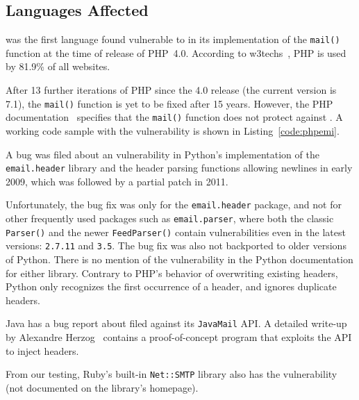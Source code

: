 \subsection{Languages Affected}

\label{languages}
 was the first language found vulnerable to \ehi in its implementation of the \texttt{mail()} function at the time of release of PHP~4.0. According to w3techs~\cite{W3techs}, PHP is used by 81.9\% of all websites.

After 13 further iterations of PHP since the 4.0 release (the current
version is 7.1), the \texttt{mail()} function is yet to be fixed after
15 years. However, the PHP documentation~\cite{PHPDocs} specifies that the \texttt{mail()} function does not protect against \ehi.
A working code sample with the vulnerability is shown in  Listing~\ref{code:phpemi}.

\begin{sloppypar}
A bug was filed about an \ehi vulnerability in Python's implementation of the \texttt{email.header} library and the header parsing functions allowing newlines in early 2009, which was followed by a partial patch in 2011.
\end{sloppypar}

Unfortunately, the bug fix was only for the \texttt{email.header} package, and not for other frequently used packages such as \texttt{email.parser}, where both the classic \texttt{Parser()} and the newer \texttt{FeedParser()} contain \ehi vulnerabilities even in the latest versions: \texttt{2.7.11} and \texttt{3.5}. The bug fix was also not backported to older versions of Python.
There is no mention of the vulnerability in the Python documentation for either library. Contrary to PHP's behavior of overwriting existing headers, Python only recognizes the first occurrence of a header, and ignores duplicate headers.

Java has a bug report about \ehi filed against its \texttt{JavaMail} API. A detailed write-up by Alexandre Herzog~\cite{Herzog.2014} contains a proof-of-concept program that exploits the API to inject headers.

From our testing, Ruby's built-in \texttt{Net::SMTP} library also has the vulnerability (not documented on the library's homepage).


